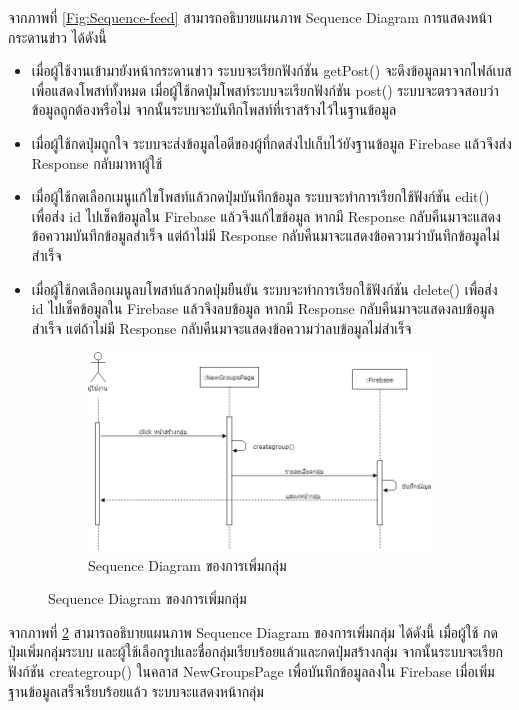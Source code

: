 จากภาพที่ \ref{Fig:Sequence-feed} สามารถอธิบายแผนภาพ Sequence Diagram การแสดงหน้ากระดานข่าว ได้ดังนี้ 
\begin{itemize}
\item เมื่อผู้ใช้งานเข้ามายังหน้ากระดานข่าว ระบบจะเรียกฟังก์ชัน getPost() จะดึงข้อมูลมาจากไฟล์เบสเพื่อแสดงโพสท์ทั้งหมด เมื่อผู้ใช้กดปุ่มโพสท์ระบบจะเรียกฟังก์ชัน post() 
ระบบจะตรวจสอบว่าข้อมูลถูกต้องหรือไม่ จากนั้นระบบจะบันทึกโพสท์ที่เราสร้างไว้ในฐานข้อมูล
\item เมื่อผู้ใช้กดปุ่มถูกใจ ระบบจะส่งข้อมูลไอดีของผู้ที่กดส่งไปเก็บไว้ยังฐานข้อมูล Firebase แล้วจึงส่ง Response กลับมาหาผู้ใช้
\item เมื่อผู้ใช้กดเลือกเมนูแก้ไขโพสท์แล้วกดปุ่มบันทึกข้อมูล ระบบจะทำการเรียกใช้ฟังก์ชัน edit() เพื่อส่ง id ไปเช็คข้อมูลใน Firebase แล้วจึงแก้ไขข้อมูล หากมี Response กลับคืนมาจะแสดงข้อความบันทึกข้อมูลสำเร็จ แต่ถ้าไม่มี Response กลับคืนมาจะแสดงข้อความว่าบันทึกข้อมูลไม่สำเร็จ
\item เมื่อผู้ใช้กดเลือกเมนูลบโพสท์แล้วกดปุ่มยืนยัน ระบบจะทำการเรียกใช้ฟังก์ชัน delete() เพื่อส่ง id ไปเช็คข้อมูลใน Firebase แล้วจึงลบข้อมูล หากมี Response กลับคืนมาจะแสดงลบข้อมูลสำเร็จ แต่ถ้าไม่มี Response กลับคืนมาจะแสดงข้อความว่าลบข้อมูลไม่สำเร็จ
\end{itemize}

\begin{figure}
	\begin{figure}[H]
		\centering
		\includegraphics[width=0.8\columnwidth]
		{Figures/3/Sequence/addgroup}
		\caption{Sequence Diagram ของการเพิ่มกลุ่ม}
		\label{Fig:Sequence-addgroup}
	\end{figure}
\end{figure}
\newpage

จากภาพที่ \ref{Fig:Sequence-addgroup} สามารถอธิบายแผนภาพ Sequence Diagram ของการเพิ่มกลุ่ม ได้ดังนี้ เมื่อผู้ใช้
กดปุ่มเพิ่มกลุ่มระบบ และผู้ใช้เลือกรูปและชื่อกลุ่มเรียบร้อยแล้วและกดปุ่มสร้างกลุ่ม  
จากนั้นระบบจะเรียกฟังก์ชัน creategroup() ในคลาส NewGroupsPage เพื่อบันทึกข้อมูลลงใน Firebase เมื่อเพิ่มฐานข้อมูลเสร็จเรียบร้อยแล้ว 
ระบบจะแสดงหน้ากลุ่ม
\newpage

